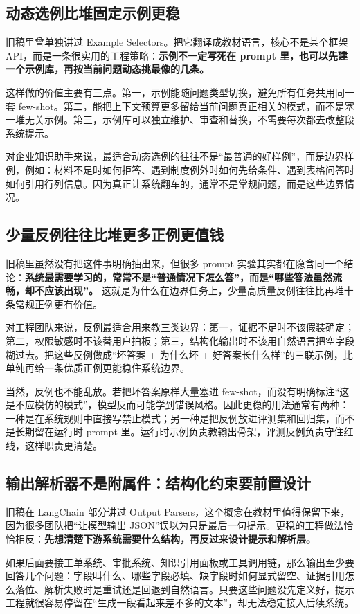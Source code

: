 \subsection{动态选例比堆固定示例更稳}
旧稿里曾单独讲过 Example Selectors。把它翻译成教材语言，核心不是某个框架 API，而是一条很实用的工程策略：\textbf{示例不一定写死在 prompt 里，也可以先建一个示例库，再按当前问题动态挑最像的几条。}

这样做的价值主要有三点。第一，示例能随问题类型切换，避免所有任务共用同一套 few-shot。第二，能把上下文预算更多留给当前问题真正相关的模式，而不是塞一堆无关示例。第三，示例库可以独立维护、审查和替换，不需要每次都去改整段系统提示。

对企业知识助手来说，最适合动态选例的往往不是“最普通的好样例”，而是边界样例，例如：材料不足时如何拒答、遇到制度例外时如何先给条件、遇到表格问答时如何引用行列信息。因为真正让系统翻车的，通常不是常规问题，而是这些边界情况。

\subsection{少量反例往往比堆更多正例更值钱}
旧稿里虽然没有把这件事明确抽出来，但很多 prompt 实验其实都在隐含同一个结论：\textbf{系统最需要学习的，常常不是“普通情况下怎么答”，而是“哪些答法虽然流畅，却不应该出现”。} 这就是为什么在边界任务上，少量高质量反例往往比再堆十条常规正例更有价值。

对工程团队来说，反例最适合用来教三类边界：第一，证据不足时不该假装确定；第二，权限敏感时不该替用户拍板；第三，结构化输出时不该用自然语言把空字段糊过去。把这些反例做成“坏答案 + 为什么坏 + 好答案长什么样”的三联示例，比单纯再给一条优质正例更能稳住系统边界。

当然，反例也不能乱放。若把坏答案原样大量塞进 few-shot，而没有明确标注“这是不应模仿的模式”，模型反而可能学到错误风格。因此更稳的用法通常有两种：一种是在系统规则中直接写禁止模式；另一种是把反例放进评测集和回归集，而不是长期留在运行时 prompt 里。运行时示例负责教输出骨架，评测反例负责守住红线，这样职责更清楚。

\subsection{输出解析器不是附属件：结构化约束要前置设计}
旧稿在 LangChain 部分讲过 Output Parsers，这个概念在教材里值得保留下来，因为很多团队把“让模型输出 JSON”误以为只是最后一句提示。更稳的工程做法恰恰相反：\textbf{先想清楚下游系统需要什么结构，再反过来设计提示和解析层。}

如果后面要接工单系统、审批系统、知识引用面板或工具调用链，那么输出至少要回答几个问题：字段叫什么、哪些字段必填、缺字段时如何显式留空、证据引用怎么落位、解析失败时是重试还是回退到自然语言。只要这些问题没先定义好，提示工程就很容易停留在“生成一段看起来差不多的文本”，却无法稳定接入后续系统。

